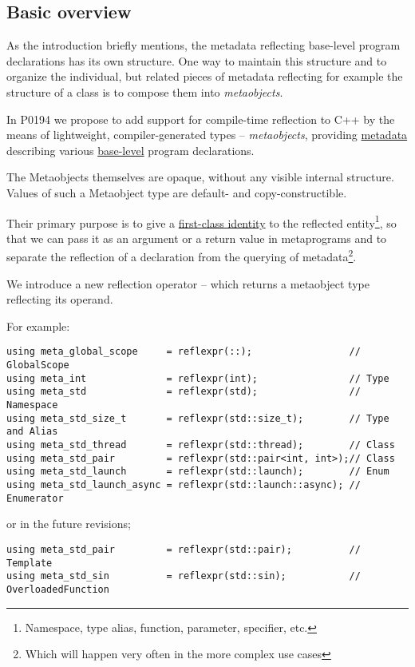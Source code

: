 \subsection{Basic overview}

As the introduction briefly mentions, the metadata reflecting base-level
program declarations has its own structure. One way to maintain this structure
and to organize the individual, but related pieces of metadata reflecting
for example the structure of a class is to compose them into {\em metaobjects}.

In P0194 we propose to add support for
compile-time reflection to C++ by the means of lightweight, compiler-generated
types -- {\em metaobjects}, providing \hyperref[term-metadata]{metadata}
describing various \hyperref[term-base-meta-level]{base-level} program declarations.

The Metaobjects themselves are opaque, without any visible internal structure.
Values of such a Metaobject type are default- and copy-constructible.

Their primary purpose is to give a \hyperref[term-first-class]{first-class identity}
to the reflected entity\footnote{Namespace, type alias, function, parameter,
specifier, etc.}, so that we can pass it as an argument or a return value
in metaprograms and to separate the reflection of a declaration from the querying
of metadata\footnote {Which will happen very often in the more complex use cases}.

We introduce a new reflection operator -- \verb@reflexpr@ which returns a
metaobject type reflecting its operand.

For example:

\begin{verbatim}
using meta_global_scope     = reflexpr(::);                 // GlobalScope
using meta_int              = reflexpr(int);                // Type
using meta_std              = reflexpr(std);                // Namespace
using meta_std_size_t       = reflexpr(std::size_t);        // Type and Alias
using meta_std_thread       = reflexpr(std::thread);        // Class
using meta_std_pair         = reflexpr(std::pair<int, int>);// Class
using meta_std_launch       = reflexpr(std::launch);        // Enum
using meta_std_launch_async = reflexpr(std::launch::async); // Enumerator
\end{verbatim}

or in the future revisions;

\begin{verbatim}
using meta_std_pair         = reflexpr(std::pair);          // Template
using meta_std_sin          = reflexpr(std::sin);           // OverloadedFunction
\end{verbatim}

